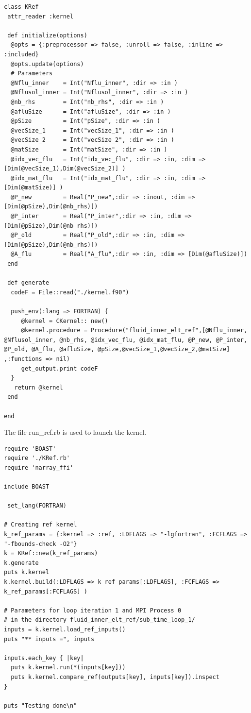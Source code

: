 \documentclass[10pt,twoside]{article}   	%
\begin{document}
\lstset{language=RUBY}
\begin{lstlisting}[caption=KRef.rb]
class KRef
 attr_reader :kernel

 def initialize(options)
  @opts = {:preprocessor => false, :unroll => false, :inline => :included}
  @opts.update(options)
  # Parameters 
  @Nflu_inner    = Int("Nflu_inner", :dir => :in )
  @Nflusol_inner = Int("Nflusol_inner", :dir => :in )
  @nb_rhs        = Int("nb_rhs", :dir => :in )
  @afluSize      = Int("afluSize", :dir => :in )
  @pSize         = Int("pSize", :dir => :in )
  @vecSize_1     = Int("vecSize_1", :dir => :in )
  @vecSize_2     = Int("vecSize_2", :dir => :in )
  @matSize       = Int("matSize", :dir => :in )
  @idx_vec_flu   = Int("idx_vec_flu", :dir => :in, :dim => [Dim(@vecSize_1),Dim(@vecSize_2)] )
  @idx_mat_flu   = Int("idx_mat_flu", :dir => :in, :dim => [Dim(@matSize)] )
  @P_new         = Real("P_new",:dir => :inout, :dim => [Dim(@pSize),Dim(@nb_rhs)])
  @P_inter       = Real("P_inter",:dir => :in, :dim => [Dim(@pSize),Dim(@nb_rhs)])
  @P_old         = Real("P_old",:dir => :in, :dim => [Dim(@pSize),Dim(@nb_rhs)])
  @A_flu         = Real("A_flu",:dir => :in, :dim => [Dim(@afluSize)])
 end

 def generate
  codeF = File::read("./kernel.f90")

  push_env(:lang => FORTRAN) {
     @kernel = CKernel:: new()
     @kernel.procedure = Procedure("fluid_inner_elt_ref",[@Nflu_inner, @Nflusol_inner, @nb_rhs, @idx_vec_flu, @idx_mat_flu, @P_new, @P_inter, @P_old, @A_flu, @afluSize, @pSize,@vecSize_1,@vecSize_2,@matSize] ,:functions => nil)
     get_output.print codeF
  }
   return @kernel
 end
 
end
\end{lstlisting}

The file run\_ref.rb is used to launch the kernel. 

\begin{lstlisting}[caption=run\_ref.rb]
require 'BOAST'
require './KRef.rb'
require 'narray_ffi'

include BOAST

 set_lang(FORTRAN)

# Creating ref kernel
k_ref_params = {:kernel => :ref, :LDFLAGS => "-lgfortran", :FCFLAGS => "-fbounds-check -O2"}
k = KRef::new(k_ref_params)
k.generate
puts k.kernel
k.kernel.build(:LDFLAGS => k_ref_params[:LDFLAGS], :FCFLAGS => k_ref_params[:FCFLAGS] )

# Parameters for loop iteration 1 and MPI Process 0 
# in the directory fluid_inner_elt_ref/sub_time_loop_1/
inputs = k.kernel.load_ref_inputs()
puts "** inputs =", inputs

inputs.each_key { |key|
  puts k.kernel.run(*(inputs[key]))
  puts k.kernel.compare_ref(outputs[key], inputs[key]).inspect
}

puts "Testing done\n"
\end{lstlisting}
\end{document}
